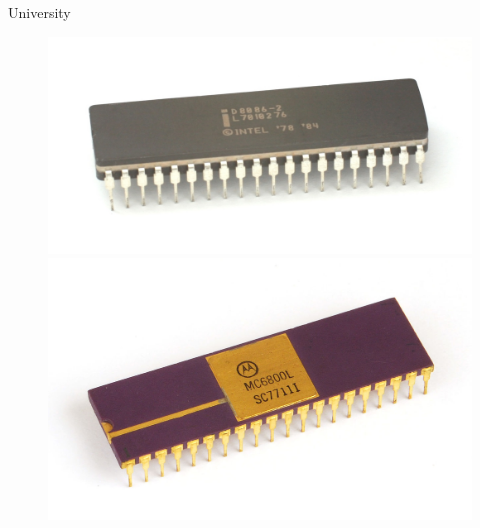 \documentclass{beamer}
\begin{document}
  \begin{frame}{University}
    \begin{figure}
      \includegraphics[scale=0.1]{images/8086}
      \pause
      \includegraphics[scale=0.5]{images/6800}
    \end{figure}
    \pause
    \begin{figure}

\end{figure}
\end{frame}
\end{document}
